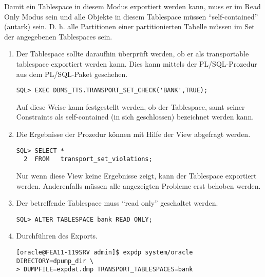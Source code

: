 \begin{itemize}
          Damit ein Tablespace in diesem Modus exportiert werden kann, muss er im Read Only Modus sein und alle Objekte in diesem Tablespace m\"ussen \enquote{self-contained} (autark) sein. D. h. alle Partitionen einer partitionierten Tabelle m\"ussen im Set der angegebenen Tablespaces sein.
          \begin{enumerate}
	    \item Der Tablespace sollte daraufhin \"uberpr\"uft werden, ob er als transportable tablespace exportiert werden kann. Dies kann mittels der PL/SQL-Prozedur  aus dem PL/SQL-Paket  geschehen.
              \begin{lstlisting}[caption={Ausf\"uhren von DBMS\_TTS}, label=admin905,language=plsql]
SQL> EXEC DBMS_TTS.TRANSPORT_SET_CHECK('BANK',TRUE);
              \end{lstlisting}
              Auf diese Weise kann festgestellt werden, ob der Tablespace, samt seiner Constraints als self-contained (in sich geschlossen) bezeichnet werden kann.
            \item Die Ergebnisse der Prozedur  k\"onnen mit Hilfe der View  abgefragt werden.
            \begin{lstlisting}[caption={Die Ergebnisse von DBMS\_TTS.transport\_set\_check}, label=admin906,language=oracle_sql]
SQL> SELECT *
  2  FROM   transport_set_violations;
              \end{lstlisting}
              Nur wenn diese View keine Ergebnisse zeigt, kann der Tablespace exportiert werden. Anderenfalls m\"ussen alle angezeigten Probleme erst behoben werden.
            \item Der betreffende Tablespace muss \enquote{read only} geschaltet werden.
              \begin{lstlisting}[caption={Tablespace Read Only schalten},label=admin907,language=oracle_sql]
SQL> ALTER TABLESPACE bank READ ONLY;
              \end{lstlisting}
            \item Durchf\"uhren des Exports.
              \begin{lstlisting}[caption={Transportable Tablespace Export},label=admin908,language=expdp_impdp,emph={[9]DIRECTORY},emphstyle={[9]\sffamily\color{blue}}]
[oracle@FEA11-119SRV admin]$ expdp system/oracle DIRECTORY=dpump_dir \
> DUMPFILE=expdat.dmp TRANSPORT_TABLESPACES=bank
              \end{lstlisting}

\end{enumerate}
\end{itemize}
